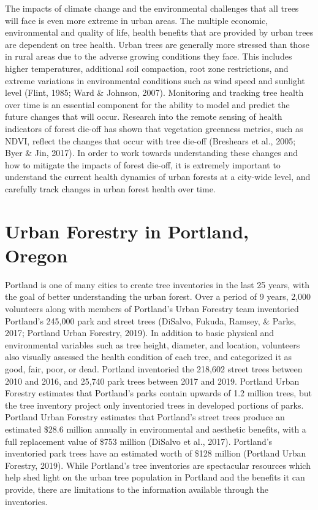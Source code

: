\documentclass[12pt,twoside]{reedthesis}
\begin{document}
The impacts of climate change and the environmental challenges that all
trees will face is even more extreme in urban areas. The multiple
economic, environmental and quality of life, health benefits that are
provided by urban trees are dependent on tree health. Urban trees are
generally more stressed than those in rural areas due to the adverse
growing conditions they face. This includes higher temperatures,
additional soil compaction, root zone restrictions, and extreme
variations in environmental conditions such as wind speed and sunlight
level (Flint, 1985; Ward \& Johnson, 2007). Monitoring and tracking tree health over
time is an essential component for the ability to model and predict the
future changes that will occur. Research into the remote sensing of
health indicators of forest die-off has shown that vegetation greenness
metrics, such as NDVI, reflect the changes that occur with tree die-off
(Breshears et al., 2005; Byer \& Jin, 2017). In order to work towards understanding
these changes and how to mitigate the impacts of forest die-off, it is
extremely important to understand the current health dynamics of urban
forests at a city-wide level, and carefully track changes in urban
forest health over time.

\hypertarget{urban-forestry-in-portland-oregon}{%
\section{Urban Forestry in Portland, Oregon}\label{urban-forestry-in-portland-oregon}}

Portland is one of many cities to create tree inventories in the last 25
years, with the goal of better understanding the urban forest. Over a
period of 9 years, 2,000 volunteers along with members of Portland's
Urban Forestry team inventoried Portland's 245,000 park and street trees
(DiSalvo, Fukuda, Ramsey, \& Parks, 2017; Portland Urban Forestry, 2019). In addition to basic
physical and environmental variables such as tree height, diameter, and
location, volunteers also visually assessed the health condition of each
tree, and categorized it as good, fair, poor, or dead. Portland
inventoried the 218,602 street trees between 2010 and 2016, and 25,740
park trees between 2017 and 2019. Portland Urban Forestry estimates that
Portland's parks contain upwards of 1.2 million trees, but the tree
inventory project only inventoried trees in developed portions of parks.
Portland Urban Forestry estimates that Portland's street trees produce
an estimated \$28.6 million annually in environmental and aesthetic
benefits, with a full replacement value of \$753 million (DiSalvo et al., 2017).
Portland's inventoried park trees have an estimated worth of \$128
million (Portland Urban Forestry, 2019). While Portland's tree inventories
are spectacular resources which help shed light on the urban tree
population in Portland and the benefits it can provide, there are
limitations to the information available through the inventories.
\end{document}
